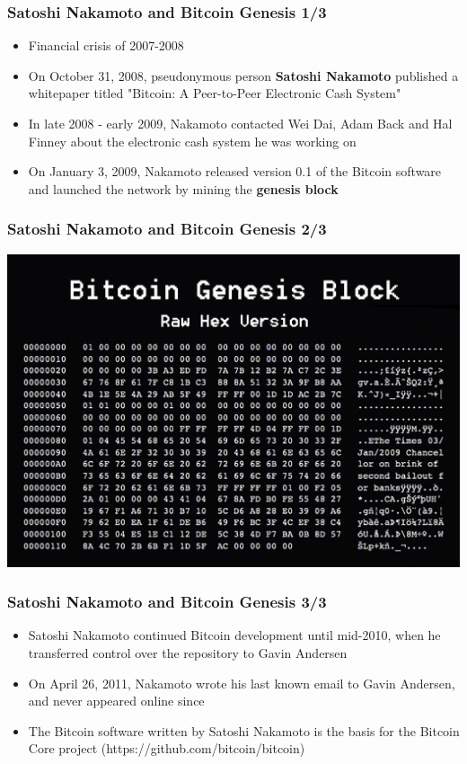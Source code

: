\documentclass{beamer}
\begin{document}
\begin{frame}
  \frametitle{Satoshi Nakamoto and Bitcoin Genesis 1/3}
  \begin{itemize}
  \item Financial crisis of 2007-2008
  \item On October 31, 2008, pseudonymous person \textbf{Satoshi Nakamoto}
    published a whitepaper titled "Bitcoin: A Peer-to-Peer Electronic Cash
    System"
  \item In late 2008 - early 2009, Nakamoto contacted Wei Dai, Adam Back and Hal
    Finney about the electronic cash system he was working on
  \item On January 3, 2009, Nakamoto released version 0.1 of the Bitcoin
    software and launched the network by mining the \textbf{genesis block}
  \end{itemize}
\end{frame}

\begin{frame}[fragile]
  \frametitle{Satoshi Nakamoto and Bitcoin Genesis 2/3}
  \includegraphics[width=\textwidth]{genesis-block}
\end{frame}

\begin{frame}
  \frametitle{Satoshi Nakamoto and Bitcoin Genesis 3/3}
  \begin{itemize}
  \item Satoshi Nakamoto continued Bitcoin development until mid-2010, when he
    transferred control over the repository to Gavin Andersen
  \item On April 26, 2011, Nakamoto wrote his last known email to Gavin
    Andersen, and never appeared online since
  \item The Bitcoin software written by Satoshi Nakamoto is the basis for the
    Bitcoin Core project (https://github.com/bitcoin/bitcoin)
  \end{itemize}
\end{frame}
\end{document}
